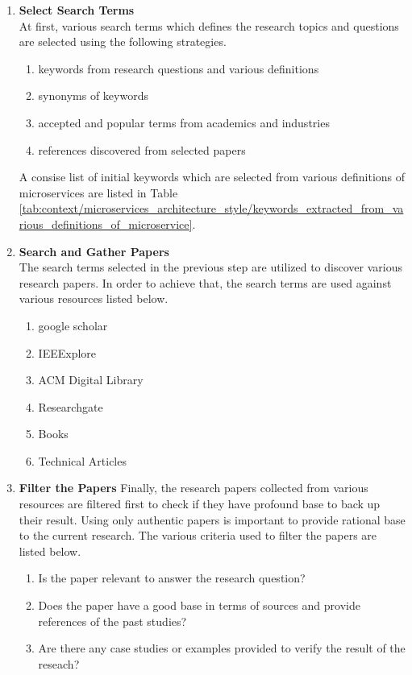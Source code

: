 \begin{enumerate}
\item \textbf{Select Search Terms}\\
At first, various search terms which defines the research topics and questions are selected using the following strategies.
\begin{enumerate}
\item keywords from research questions and various definitions
\item synonyms of keywords
\item accepted and popular terms from academics and industries
\item references discovered from selected papers
\end{enumerate}
A consise list of initial keywords which are selected from various definitions of microservices are listed in Table \ref{tab:context/microservices_architecture_style/keywords_extracted_from_various_definitions_of_microservice}.
\item \textbf{Search and Gather Papers}\\
The search terms selected in the previous step are utilized to discover various research papers. In order to achieve that, the search terms are used against various resources listed below.
\begin{enumerate}
\item google scholar
\item IEEExplore
\item ACM Digital Library
\item Researchgate
\item Books
\item Technical Articles
\end{enumerate}
\item \textbf{Filter the Papers}
Finally, the research papers collected from various resources are filtered first to check if they have profound base to back up their result. Using only authentic papers is important to provide rational base to the current research. The various criteria used to filter the papers are listed below.
\begin{enumerate}
\item Is the paper relevant to answer the research question?
\item Does the paper have a good base in terms of sources and provide references of the past studies? 
\item Are there any case studies or examples provided to verify the result of the reseach?
\end{enumerate}
\end{enumerate}

